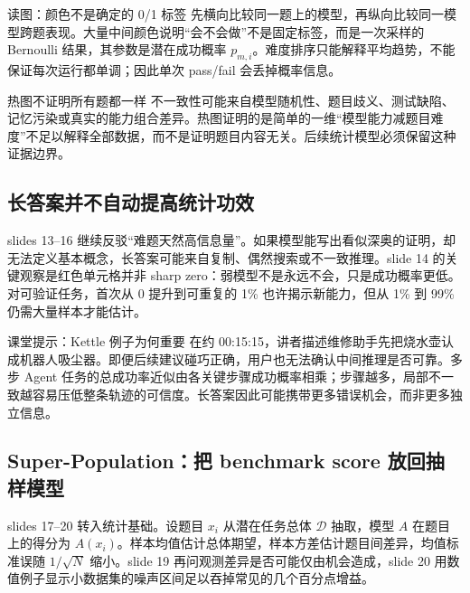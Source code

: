\begin{knowledgebox}{读图：颜色不是确定的 0/1 标签}
先横向比较同一题上的模型，再纵向比较同一模型跨题表现。大量中间颜色说明“会不会做”不是固定标签，而是一次采样的 Bernoulli 结果，其参数是潜在成功概率 $p_{m,i}$。难度排序只能解释平均趋势，不能保证每次运行都单调；因此单次 pass/fail 会丢掉概率信息。
\end{knowledgebox}

\begin{warningbox}{热图不证明所有题都一样}
不一致性可能来自模型随机性、题目歧义、测试缺陷、记忆污染或真实的能力组合差异。热图证明的是简单的一维“模型能力减题目难度”不足以解释全部数据，而不是证明题目内容无关。后续统计模型必须保留这种证据边界。
\end{warningbox}

\subsection{长答案并不自动提高统计功效}

slides 13--16 继续反驳“难题天然高信息量”。如果模型能写出看似深奥的证明，却无法定义基本概念，长答案可能来自复制、偶然搜索或不一致推理。slide 14 的关键观察是红色单元格并非 sharp zero：弱模型不是永远不会，只是成功概率更低。对可验证任务，首次从 0 提升到可重复的 1\% 也许揭示新能力，但从 1\% 到 99\% 仍需大量样本才能估计。


\begin{knowledgebox}{课堂提示：Kettle 例子为何重要}
在约 00:15:15，讲者描述维修助手先把烧水壶认成机器人吸尘器。即便后续建议碰巧正确，用户也无法确认中间推理是否可靠。多步 Agent 任务的总成功率近似由各关键步骤成功概率相乘；步骤越多，局部不一致越容易压低整条轨迹的可信度。长答案因此可能携带更多错误机会，而非更多独立信息。
\end{knowledgebox}

\subsection{Super-Population：把 benchmark score 放回抽样模型}

slides 17--20 转入统计基础。设题目 $x_i$ 从潜在任务总体 $\mathcal D$ 抽取，模型 $A$ 在题目上的得分为 $A(x_i)$。样本均值估计总体期望，样本方差估计题目间差异，均值标准误随 $1/\sqrt N$ 缩小。slide 19 再问观测差异是否可能仅由机会造成，slide 20 用数值例子显示小数据集的噪声区间足以吞掉常见的几个百分点增益。

